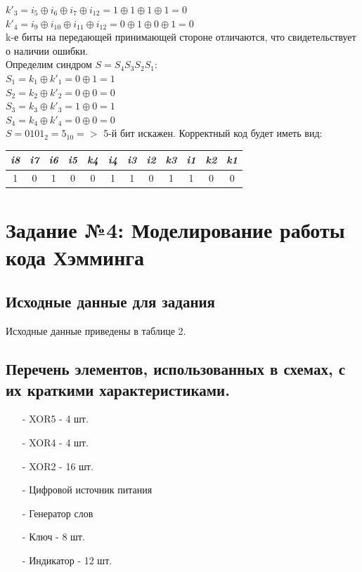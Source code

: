 \documentclass[14pt]{article}
\begin{document}
$k'_3 = i_5 \oplus i_6 \oplus i_7 \oplus i_{12} = 1 \oplus 1 \oplus 1 \oplus 1 = 0$ \\

$k'_4 = i_9 \oplus i_{10} \oplus i_{11} \oplus i_{12}= 0 \oplus 1 \oplus 0 \oplus 1 = 0$ \\

k-е биты на передающей принимающей стороне отличаются, что
свидетельствует о наличии ошибки.\\

Определим синдром $S = S_4 S_3 S_2 S_1$:\\

$S_1 = k_1 \oplus k'_1 = 0 \oplus 1 = 1$\\

$S_2 = k_2 \oplus k'_2 = 0 \oplus 0 = 0$\\

$S_3 = k_3 \oplus k'_3 = 1 \oplus 0 = 1$\\

$S_4 = k_4 \oplus k'_4 = 0 \oplus 0 = 0$\\

$S = 0101_2 = 5_{10} =>$ 5-й бит искажен. Корректный код будет иметь вид:

\begin{table}[h]
\begin{tabular}{|c|c|c|c|c|c|c|c|c|c|c|c|}
\hline
\textit{i8} & \textit{i7} & \textit{i6} & \textit{i5} & \textit{k4} & \textit{i4} & \textit{i3} & \textit{i2} & \textit{k3} & \textit{i1} & \textit{k2} & \textit{k1} \\ \hline
1           & 0           & 1           & 0           & 0           & 1           & 1           & 0           & 1           & 1           & 0           & 0           \\ \hline
\end{tabular}
\end{table}

\section{Задание №4: Моделирование работы кода Хэмминга}
\subsection{Исходные данные для задания}
Исходные данные приведены в таблице 2.
\subsection{Перечень элементов, использованных в схемах, с их краткими характеристиками.}
\begin{itemize}
    \item [-] XOR5 - 4 шт.
    \item [-] XOR4 - 4 шт.
    \item [-] XOR2 - 16 шт.
    \item [-] Цифровой источник питания
    \item [-] Генератор слов
    \item [-] Ключ - 8 шт.
    \item [-] Индикатор - 12 шт.
\end{itemize}
\end{document}
